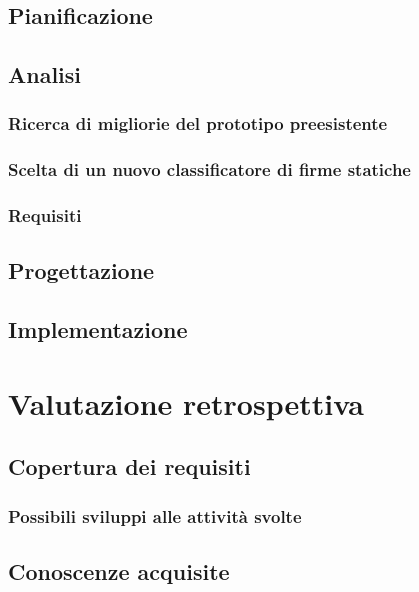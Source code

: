 \subsection{Pianificazione}
\label{3.1}

\subsection{Analisi}
\label{3.2}

\subsubsection{Ricerca di migliorie del prototipo preesistente}
\label{3.2.1}

\subsubsection{Scelta di un nuovo classificatore di firme statiche}
\label{3.2.2}

\subsubsection{Requisiti}
\label{3.2.3}

\subsection{Progettazione}
\label{3.3}

\subsection{Implementazione}
\label{3.4}
\newpage

\section{Valutazione retrospettiva}
\label{4.0}

\subsection{Copertura dei requisiti}
\label{4.1}

\subsubsection{Possibili sviluppi alle attività svolte}
\subsection{Conoscenze acquisite}

